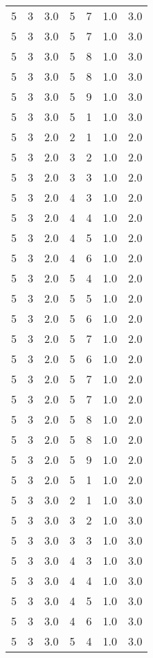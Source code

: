 \documentclass[a4paper,12pt]{article}
\begin{document}
\begin{center}
\begin{longtable}{ c c c | c c c | c }
        5 & 3 & 3.0 & 5 & 7 & 1.0 & 3.0 \\
        5 & 3 & 3.0 & 5 & 7 & 1.0 & 3.0 \\
        5 & 3 & 3.0 & 5 & 8 & 1.0 & 3.0 \\
        5 & 3 & 3.0 & 5 & 8 & 1.0 & 3.0 \\
        5 & 3 & 3.0 & 5 & 9 & 1.0 & 3.0 \\
        5 & 3 & 3.0 & 5 & 1 & 1.0 & 3.0 \\
        5 & 3 & 2.0 & 2 & 1 & 1.0 & 2.0 \\
        5 & 3 & 2.0 & 3 & 2 & 1.0 & 2.0 \\
        5 & 3 & 2.0 & 3 & 3 & 1.0 & 2.0 \\
        5 & 3 & 2.0 & 4 & 3 & 1.0 & 2.0 \\
        5 & 3 & 2.0 & 4 & 4 & 1.0 & 2.0 \\
        5 & 3 & 2.0 & 4 & 5 & 1.0 & 2.0 \\
        5 & 3 & 2.0 & 4 & 6 & 1.0 & 2.0 \\
        5 & 3 & 2.0 & 5 & 4 & 1.0 & 2.0 \\
        5 & 3 & 2.0 & 5 & 5 & 1.0 & 2.0 \\
        5 & 3 & 2.0 & 5 & 6 & 1.0 & 2.0 \\
        5 & 3 & 2.0 & 5 & 7 & 1.0 & 2.0 \\
        5 & 3 & 2.0 & 5 & 6 & 1.0 & 2.0 \\
        5 & 3 & 2.0 & 5 & 7 & 1.0 & 2.0 \\
        5 & 3 & 2.0 & 5 & 7 & 1.0 & 2.0 \\
        5 & 3 & 2.0 & 5 & 8 & 1.0 & 2.0 \\
        5 & 3 & 2.0 & 5 & 8 & 1.0 & 2.0 \\
        5 & 3 & 2.0 & 5 & 9 & 1.0 & 2.0 \\
        5 & 3 & 2.0 & 5 & 1 & 1.0 & 2.0 \\
        5 & 3 & 3.0 & 2 & 1 & 1.0 & 3.0 \\
        5 & 3 & 3.0 & 3 & 2 & 1.0 & 3.0 \\
        5 & 3 & 3.0 & 3 & 3 & 1.0 & 3.0 \\
        5 & 3 & 3.0 & 4 & 3 & 1.0 & 3.0 \\
        5 & 3 & 3.0 & 4 & 4 & 1.0 & 3.0 \\
        5 & 3 & 3.0 & 4 & 5 & 1.0 & 3.0 \\
        5 & 3 & 3.0 & 4 & 6 & 1.0 & 3.0 \\
        5 & 3 & 3.0 & 5 & 4 & 1.0 & 3.0 \\

\end{longtable}
\end{center}
\end{document}
